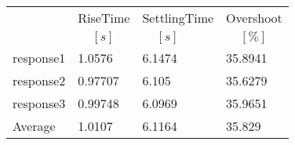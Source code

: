 \begin{tabular}{llll}
  & RiseTime & SettlingTime & Overshoot  \\ 
  & $\;\;\;\;[s]$ & $\;\;\;\;[s]$ & $\;\;\;\;[\%]$  \\ 
\hline 
response1 & 1.0576 & 6.1474 & 35.8941  \\ 
response2 & 0.97707 & 6.105 & 35.6279\\ 
response3 & 0.99748 & 6.0969 & 35.9651  \\ 
Average & 1.0107 & 6.1164 & 35.829 \\ 
\hline 
\end{tabular}
